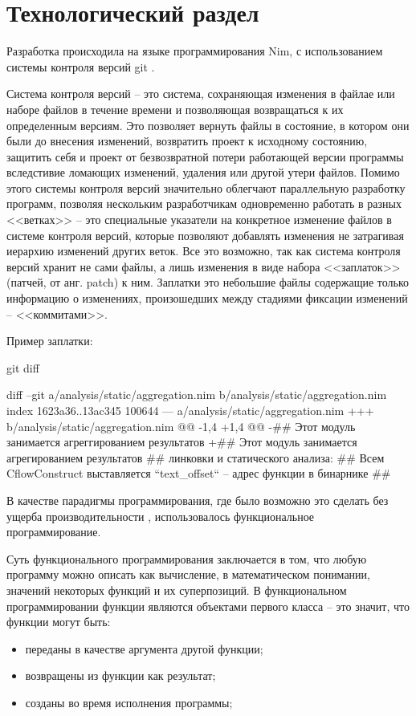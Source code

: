 \chapter{Технологический раздел}\label{ch:ch3}
Разработка {\ProgModule} происходила на языке программирования Nim,
с использованием системы контроля версий git \autocite{git}.

Система контроля версий -- это система, сохраняющая
изменения в файлае или наборе файлов в течение времени и позволяющая возвращаться к их
определенным версиям. 
Это позволяет вернуть файлы в состояние, в котором они были до внесения изменений,
возвратить проект к исходному состоянию, защитить себя и проект от безвозвратной потери
работающей версии программы вследстивие ломающих изменений, удаления или другой утери файлов.
Помимо этого системы контроля версий значительно облегчают параллельную разработку программ,
позволяя нескольким разработчикам одновременно работать в разных <<ветках>> -- 
это специальные указатели на конкретное изменение файлов в системе контроля версий,
которые позволяют добавлять изменения не затрагивая иерархию изменений других веток.
Все это возможно, так как система контроля версий хранит не сами файлы, а лишь
изменения в виде набора <<заплаток>> (патчей, от анг. patch) к ним. Заплатки это небольшие файлы
содержащие только информацию о изменениях, произошедших между стадиями фиксации изменений -- 
<<коммитами>>.

Пример заплатки:
\hspace{-3ex}
\begin{ListingEnv}[!h]
    \captiondelim{ }
    \caption{git diff}\label{lst:diff}
    \small
    \begin{Verb}[]
    diff --git a/analysis/static/aggregation.nim b/analysis/static/aggregation.nim
    index 1623a36..13ac345 100644
    --- a/analysis/static/aggregation.nim
    +++ b/analysis/static/aggregation.nim
    @@ -1,4 +1,4 @@
    -## Этот модуль занимается агреггированием результатов
    +## Этот модуль занимается агрегированием результатов
     ## линковки и статического анализа:
     ## Всем CflowConstruct выставляется ``text_offset`` -- адрес функции в бинарнике
     ##
    \end{Verb}
\end{ListingEnv}

В качестве парадигмы программирования, где было возможно это сделать без
ущерба производительности {\ProgModule}, использовалось функциональное
программирование.

Суть функционального программирования заключается в том,
что любую программу можно описать как вычисление, в математическом понимании,
значений некоторых функций и их суперпозиций.
В функциональном программировании функции являются объектами первого
класса -- это значит, что функции могут быть:
\begin{itemize}
    \item переданы в качестве аргумента другой функции;
    \item возвращены из функции как результат;
    \item созданы во время исполнения программы;
\end{itemize}

